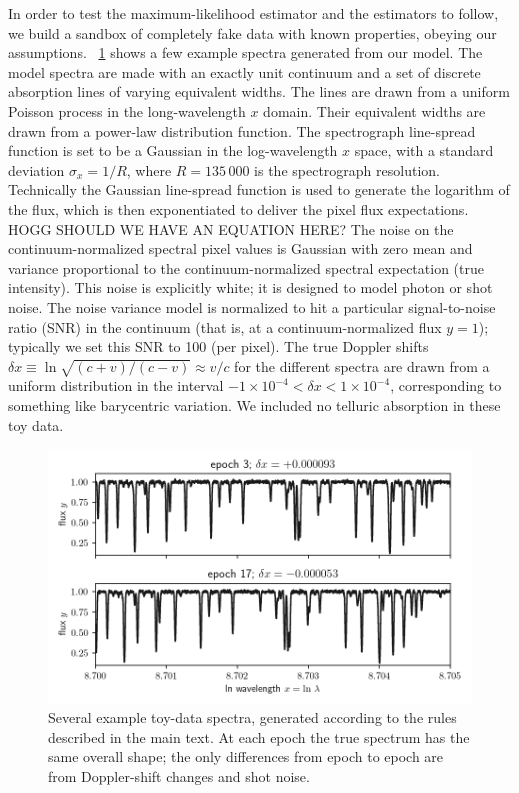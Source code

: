 \documentclass[modern]{aastex631}
\newcommand{\figref}[1]{\figurename~\ref{#1}}
\begin{document}
In order to test the maximum-likelihood estimator and the estimators to follow, we build a sandbox of completely fake data with known properties, obeying our assumptions.
\figref{fig:data} shows a few example spectra generated from our model.
The model spectra are made with an exactly unit continuum and a set of discrete absorption lines of varying equivalent widths.
The lines are drawn from a uniform Poisson process in the long-wavelength $x$ domain.
Their equivalent widths are drawn from a power-law distribution function.
The spectrograph line-spread function is set to be a Gaussian in the log-wavelength $x$ space, with a standard deviation $\sigma_x=1/R$, where $R=135\,000$ is the spectrograph resolution.
Technically the Gaussian line-spread function is used to generate the logarithm of the flux, which is then exponentiated to deliver the pixel flux expectations. HOGG SHOULD WE HAVE AN EQUATION HERE?
The noise on the continuum-normalized spectral pixel values is Gaussian with zero mean and variance proportional to the continuum-normalized spectral expectation (true intensity).
This noise is explicitly white; it is designed to model photon or shot noise.
The noise variance model is normalized to hit a particular signal-to-noise ratio (SNR) in the continuum (that is, at a continuum-normalized flux $y=1$); typically we set this SNR to 100 (per pixel).
The true Doppler shifts $\delta x\equiv\ln\sqrt{(c+v)/(c-v)}\approx v/c$ for the different spectra are drawn from a uniform distribution in the interval $-1\times10^{-4}<\delta x<1\times10^{-4}$, corresponding to something like barycentric variation.
We included no telluric absorption in these toy data.

\begin{figure}[tp]
  \begin{mdframed}
    \begin{center}
    \includegraphics[width=\textwidth]{../notebook/data.png}
    \end{center}
    \caption{Several example toy-data spectra, generated according to the rules described in the main text.
    At each epoch the true spectrum has the same overall shape; the only differences from epoch to epoch are from Doppler-shift changes and shot noise.\label{fig:data}}
  \end{mdframed}
\end{figure}
\end{document}
